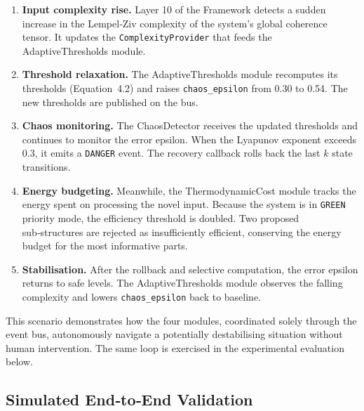 \begin{enumerate}
    \item \textbf{Input complexity rise.}  Layer 10 of the \Apeiron{} Framework
          detects a sudden increase in the Lempel‑Ziv complexity of the
          system's global coherence tensor.  It updates the
          \texttt{ComplexityProvider} that feeds the AdaptiveThresholds module.
    \item \textbf{Threshold relaxation.}  The AdaptiveThresholds module
          recomputes its thresholds (Equation~4.2) and raises
          \texttt{chaos\_epsilon} from 0.30 to 0.54.  The new thresholds are
          published on the bus.
    \item \textbf{Chaos monitoring.}  The ChaosDetector receives the updated
          thresholds and continues to monitor the error epsilon.  When the
          Lyapunov exponent exceeds 0.3, it emits a \texttt{DANGER} event.
          The recovery callback rolls back the last $k$ state transitions.
        \item \textbf{Energy budgeting.}  Meanwhile, the ThermodynamicCost module
          tracks the energy spent on processing the novel input.  Because the
          system is in \texttt{GREEN} priority mode, the efficiency threshold
          is doubled.  Two proposed sub‑structures are rejected as
          insufficiently efficient, conserving the energy budget for the most
          informative parts.
    \item \textbf{Stabilisation.}  After the rollback and selective
          computation, the error epsilon returns to safe levels.  The
          AdaptiveThresholds module observes the falling complexity and
          lowers \texttt{chaos\_epsilon} back to baseline.
\end{enumerate}

This scenario demonstrates how the four modules, coordinated solely through
the event bus, autonomously navigate a potentially destabilising situation
without human intervention.  The same loop is exercised in the experimental
evaluation below.

\subsection{Simulated End‑to‑End Validation}

